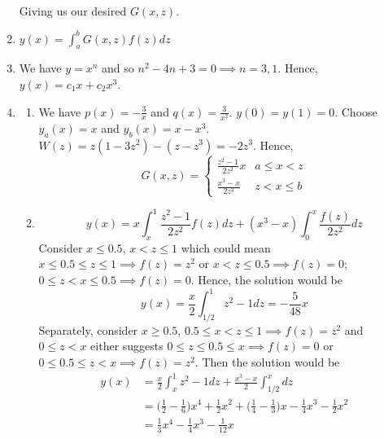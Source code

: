 \documentclass[a4paper]{article}
\begin{document}
\begin{ans}
\begin{enumerate}[label=(\alph*)]
\begin{align}
\end{align}
Giving us our desired $G(x,z)$.
\item $y(x)=\int_a^bG(x,z)f(z)dz$
\item We have $y=x^n$ and so $n^2-4n+3=0\implies n=3,1$. Hence, $y(x)=c_1x+c_2x^3$.
\item \begin{enumerate}[label=(\roman*)]
\item We have $p(x)=-\frac{3}{x}$ and $q(x)=\frac{3}{x^2}$. $y(0)=y(1)=0$. Choose $y_a(x)=x$ and $y_b(x)=x-x^3$. $W(z)=z(1-3z^2)-(z-z^3)=-2z^3$. Hence, 
$$G(x,z)=
\left\{
        \begin{array}{ll}
      \frac{z^2-1}{2z^2}x & a\leq x< z \\
      \frac{x^3-x}{2z^2} & z< x\leq b 
        \end{array}
    \right.$$
\item 
$$y(x)=x\int_x^1\frac{z^2-1}{2z^2}f(z)dz+(x^3-x)\int_0^x\frac{f(z)}{2z^2}dz$$
Consider $x\leq 0.5$, $x< z\leq 1$ which could mean $x\leq0.5\leq z\leq 1\implies f(z)=z^2$ or $x< z\leq 0.5\implies f(z)=0$; $0\leq z< x\leq0.5\implies f(z)=0$. Hence, the solution would be
$$y(x)=\frac{x}{2}\int_{1/2}^1z^2-1dz=-\frac{5}{48}x$$
Separately, consider $x\geq0.5$, $0.5\leq x< z\leq 1\implies f(z)=z^2$ and $0\leq z< x$ either suggests $0\leq z\leq 0.5\leq x\implies f(z)=0$ or $0\leq 0.5\leq z< x\implies f(z)=z^2$.  Then the solution would be
\begin{align}
y(x)&=\frac{x}{2}\int_x^1z^2-1dz+\frac{x^3-x}{2}\int_{1/2}^xdz\nonumber\\&=\bigg(\frac{1}{2}-\frac{1}{6}\bigg)x^4+\frac{1}{2}x^2+\bigg(\frac{1}{4}-\frac{1}{3}\bigg)x-\frac{1}{4}x^3-\frac{1}{2}x^2\nonumber\\&=\frac{1}{3}x^4-\frac{1}{4}x^3-\frac{1}{12}x\nonumber
\end{align}
\end{enumerate}
\end{enumerate}
\end{ans}
\newpage
\end{document}
